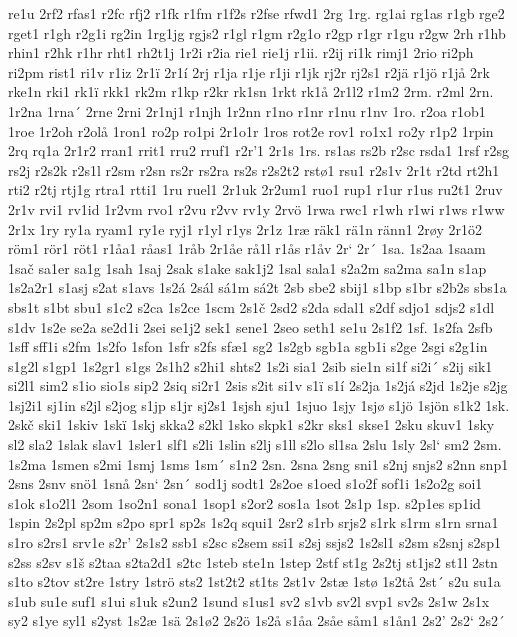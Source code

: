 re1u
2rf2
rfas1
r2fc
rfj2
r1fk
r1fm
r1f2s
r2fse
rfwd1
2rg
1rg.
rg1ai
rg1as
r1gb
rge2
rget1
r1gh
r2g1i
rg2in
1rg1jg
rgjs2
r1gl
r1gm
r2g1o
r2gp
r1gr
r1gu
r2gw
2rh
r1hb
rhin1
r2hk
r1hr
rht1
rh2t1j
1r2i
r2ia
rie1
rie1j
r1ii.
r2ij
ri1k
rimj1
2rio
ri2ph
ri2pm
rist1
ri1v
r1iz
2r1ï
2r1í
2rj
r1ja
r1je
r1ji
r1jk
rj2r
rj2s1
r2jä
r1jö
r1jå
2rk
rke1n
rki1
rk1ï
rkk1
rk2m
r1kp
r2kr
rk1sn
1rkt
rk1å
2r1l2
r1m2
2rm.
r2ml
2rn.
1r2na
1rna´
2rne
2rni
2r1nj1
r1njh
1r2nn
r1no
r1nr
r1nu
r1nv
1ro.
r2oa
r1ob1
1roe
1r2oh
r2olå
1ron1
ro2p
ro1pi
2r1o1r
1ros
rot2e
rov1
ro1x1
ro2y
r1p2
1rpin
2rq
rq1a
2r1r2
rran1
rrit1
rru2
rruf1
r2r'1
2r1s
1rs.
rs1as
rs2b
r2sc
rsda1
1rsf
r2sg
rs2j
r2s2k
r2s1l
r2sm
r2sn
rs2r
rs2ra
rs2s
r2s2t2
rstø1
rsu1
r2s1v
2r1t
r2td
rt2h1
rti2
r2tj
rtj1g
rtra1
rtti1
1ru
ruel1
2r1uk
2r2um1
ruo1
rup1
r1ur
r1us
ru2t1
2ruv
2r1v
rvi1
rv1id
1r2vm
rvo1
r2vu
r2vv
rv1y
2rvö
1rwa
rwc1
r1wh
r1wi
r1ws
r1ww
2r1x
1ry
ry1a
ryam1
ry1e
ryj1
r1yl
r1ys
2r1z
1ræ
räk1
rä1n
ränn1
2røy
2r1ö2
röm1
rör1
röt1
r1åa1
råas1
1råb
2r1åe
rå1l
r1ås
r1åv
2r`
2r´
1sa.
1s2aa
1saam
1sač
sa1er
sa1g
1sah
1saj
2sak
s1ake
sak1j2
1sal
sala1
s2a2m
sa2ma
sa1n
s1ap
1s2a2r1
s1asj
s2at
s1avs
1s2á
2sál
sá1m
sá2t
2sb
sbe2
sbij1
s1bp
s1br
s2b2s
sbs1a
sbs1t
s1bt
sbu1
s1c2
s2ca
1s2ce
1scm
2s1č
2sd2
s2da
sdal1
s2df
sdjo1
sdjs2
s1dl
s1dv
1s2e
se2a
se2d1i
2sei
se1j2
sek1
sene1
2seo
seth1
se1u
2s1f2
1sf.
1s2fa
2sfb
1sff
sff1i
s2fm
1s2fo
1sfon
1sfr
s2fs
sfæ1
sg2
1s2gb
sgb1a
sgb1i
s2ge
2sgi
s2g1in
s1g2l
s1gp1
1s2gr1
s1gs
2s1h2
s2hi1
shts2
1s2i
sia1
2sib
sie1n
si1f
si2i´
s2ij
sik1
si2l1
sim2
s1io
sio1s
sip2
2siq
si2r1
2sis
s2it
si1v
s1ï
s1í
2s2ja
1s2já
s2jd
1s2je
s2jg
1sj2i1
sj1in
s2jl
s2jog
s1jp
s1jr
sj2s1
1sjsh
sju1
1sjuo
1sjy
1sjø
s1jö
1sjön
s1k2
1sk.
2skč
ski1
1skiv
1skï
1skj
skka2
s2kl
1sko
skpk1
s2kr
sks1
skse1
2sku
skuv1
1sky
sl2
sla2
1slak
slav1
1sler1
slf1
s2li
1slin
s2lj
s1ll
s2lo
sl1sa
2slu
1sly
2sl`
sm2
2sm.
1s2ma
1smen
s2mi
1smj
1sms
1sm´
s1n2
2sn.
2sna
2sng
sni1
s2nj
snjs2
s2nn
snp1
2sns
2snv
snö1
1snå
2sn`
2sn´
sod1j
sodt1
2s2oe
s1oed
s1o2f
sof1i
1s2o2g
soi1
s1ok
s1o2l1
2som
1so2n1
sona1
1sop1
s2or2
sos1a
1sot
2s1p
1sp.
s2p1es
sp1id
1spin
2s2pl
sp2m
s2po
spr1
sp2s
1s2q
squi1
2sr2
s1rb
srjs2
s1rk
s1rm
s1rn
srna1
s1ro
s2rs1
srv1e
s2r'
2s1s2
ssb1
s2sc
s2sem
ssi1
s2sj
ssjs2
1s2sl1
s2sm
s2snj
s2sp1
s2ss
s2sv
s1š
s2taa
s2ta2d1
s2tc
1steb
ste1n
1step
2stf
st1g
2s2tj
st1js2
st1l
2stn
s1to
s2tov
st2re
1stry
1strö
sts2
1st2t2
st1ts
2st1v
2stæ
1stø
1s2tå
2st´
s2u
su1a
s1ub
su1e
suf1
s1ui
s1uk
s2un2
1sund
s1us1
sv2
s1vb
sv2l
svp1
sv2s
2s1w
2s1x
sy2
s1ye
syl1
s2yst
1s2æ
1sä
2s1ø2
2s2ö
1s2å
s1åa
2såe
såm1
s1ån1
2s2'
2s2`
2s2´
